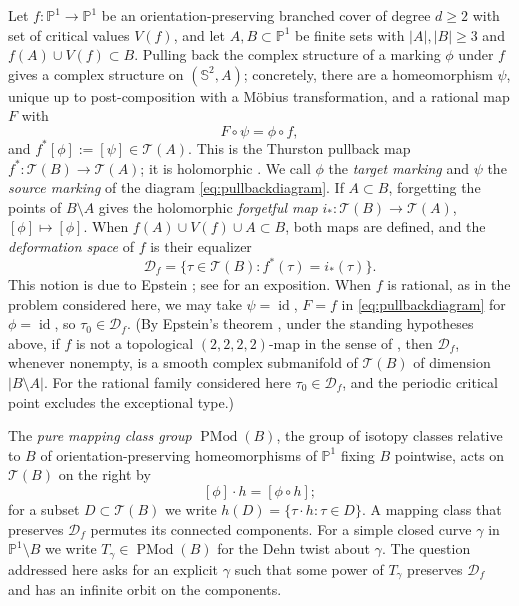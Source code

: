 \documentclass[11pt]{article}
\newcommand{\Pone}{\mathbb P^1}
\newcommand{\Sph}{\mathbb S^2}
\newcommand{\Teich}{\mathcal T}
\newcommand{\D}{\mathcal D}
\newcommand{\id}{\operatorname{id}}
\newcommand{\PMod}{\operatorname{PMod}}
\theoremstyle{remark}
\numberwithin{equation}{section}
\begin{document}
Let $f\colon\Pone\to\Pone$ be an orientation-preserving branched cover of
degree $d\ge2$ with set of critical values $V(f)$, and let $A,B\subset\Pone$
be finite sets with $|A|,|B|\ge3$ and $f(A)\cup V(f)\subset B$.
Pulling back the complex structure of a marking $\phi$ under $f$ gives a
complex structure on $(\Sph,A)$; concretely, there are a homeomorphism
$\psi$, unique up to post-composition with a M\"obius transformation, and a
rational map $F$ with
\begin{equation}\label{eq:pullbackdiagram}
 F\circ\psi=\phi\circ f ,
\end{equation}
and $f^*[\phi]:=[\psi]\in\Teich(A)$. This is the Thurston pullback map
$f^*\colon\Teich(B)\to\Teich(A)$; it is holomorphic
\cite[\S1.3, Prop.\ 1.4]{BCT}. We call $\phi$ the \emph{target marking} and
$\psi$ the \emph{source marking} of the diagram
\eqref{eq:pullbackdiagram}. If $A\subset B$, forgetting the points of
$B\setminus A$ gives the holomorphic \emph{forgetful map}
$i_*\colon\Teich(B)\to\Teich(A)$, $[\phi]\mapsto[\phi]$. When
$f(A)\cup V(f)\cup A\subset B$, both maps are defined, and the
\emph{deformation space} of $f$ is their equalizer
\[
 \D_f=\{\tau\in\Teich(B):f^*(\tau)=i_*(\tau)\}.
\]
This notion is due to Epstein \cite{Ep}; see \cite[\S1.4]{BCT} for an
exposition. When $f$ is rational, as in the problem considered here, we
may take $\psi=\id$, $F=f$ in \eqref{eq:pullbackdiagram} for $\phi=\id$,
so $\tau_0\in\D_f$. (By Epstein's theorem \cite[Thm.\ 1.5]{BCT}, under the
standing hypotheses above, if $f$ is not a topological $(2,2,2,2)$-map in
the sense of \cite[\S1.4]{BCT}, then $\D_f$, whenever nonempty, is a smooth
complex submanifold of $\Teich(B)$ of dimension $|B\setminus A|$. For the
rational family considered here $\tau_0\in\D_f$, and the periodic critical
point excludes the exceptional type.)

The \emph{pure mapping class group} $\PMod(B)$, the group of isotopy classes
relative to $B$ of orientation-preserving homeomorphisms of $\Pone$ fixing
$B$ pointwise, acts on $\Teich(B)$ on the right by
\begin{equation}\label{eq:rightaction}
 [\phi]\cdot h=[\phi\circ h];
\end{equation}
for a subset $D\subset\Teich(B)$ we write $h(D)=\{\tau\cdot h:\tau\in D\}$.
A mapping class that preserves $\D_f$ permutes its connected components.
For a simple closed curve $\gamma$ in $\Pone\setminus B$ we write
$T_\gamma\in\PMod(B)$ for the Dehn twist about $\gamma$. The question
addressed here asks for an explicit $\gamma$ such that some power of
$T_\gamma$ preserves $\D_f$ and has an infinite orbit on the components.
\end{document}
